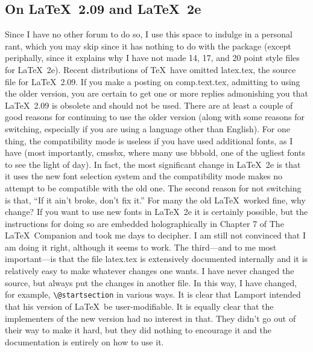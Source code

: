 \documentclass[12pt]{article}
\begin{document}
{\subsection{On \LaTeX\ 2.09 and \LaTeX\ 2e}
 Since I have no other forum to do so, I use this space to indulge in a
personal rant, which you may skip since it has nothing to do with the
package (except periphally, since it explains why I have not made 14,
17, and 20 point style files for \LaTeX\ 2e).  Recent distributions of
\TeX\ have omitted latex.tex, the source file for \LaTeX\ 2.09.  If you
make a posting on comp.text.tex, admitting to using the older version,
you are certain to get one or more replies admonishing you that \LaTeX\
2.09 is obsolete and should not be used.  There are at least a couple of
good reasons for continuing to use the older version (along with some
reasons for switching, especially if you are using a language other than
English).  For one thing, the compatibility mode is useless if you have
used additional fonts, as I have (most importantly, cmssbx, where many
use bbbold, one of the ugliest fonts to see the light of day).  In fact,
the most significant change in \LaTeX\ 2e is that it uses the new font
selection system and the compatibility mode makes no attempt to be
compatible with the old one.  The second reason for not switching is
that, ``If it ain't broke, don't fix it.''  For many the old \LaTeX\
worked fine, why change?  If you want to use new fonts in \LaTeX\ 2e it
is certainly possible, but the instructions for doing so are embedded
holographically in Chapter 7 of The \LaTeX\ Companion and took me days
to decipher.  I am still not convinced that I am doing it right,
although it seems to work.  The third---and to me most important---is
that the file latex.tex is extensively documented internally and it is
relatively easy to make whatever changes one wants.  I have never
changed the source, but always put the changes in another file.  In this
way, I have changed, for example,
\index{\backslash @startsection}\verb.\@startsection.  in various ways.
It is clear that Lamport intended that his version of \LaTeX\ be
user-modifiable.  It is equally clear that the implementers of the new
version had no interest in that.  They didn't go out of their way to
make it hard, but they did nothing to encourage it and the documentation
is entirely on how to use it.

}
\end{document}
